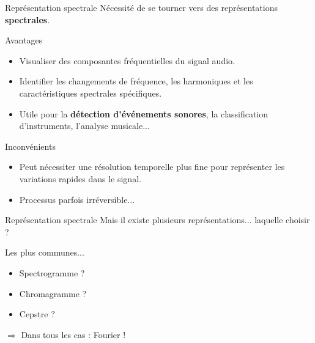 \documentclass[compress,xcolor=table]{beamer}
\begin{document}
\begin{frame}{Représentation spectrale}
    Nécessité de se tourner vers des représentations \textbf{spectrales}.

    \begin{block}{Avantages}
        \begin{itemize}
            \item Visualiser des composantes fréquentielles du signal audio. %
            \item Identifier les changements de fréquence, les harmoniques et les caractéristiques spectrales spécifiques.
            \item Utile pour la \textbf{détection d'événements sonores}, la classification d'instruments, l'analyse musicale...
        \end{itemize}
    \end{block}

    \begin{alertblock}{Inconvénients}
        \begin{itemize}
            \item Peut nécessiter une résolution temporelle plus fine pour représenter les variations rapides dans le signal.
            \item Processus parfois irréversible...
        \end{itemize}
    \end{alertblock}

\end{frame}

\begin{frame}{Représentation spectrale}
    Mais il existe plusieurs représentations... laquelle choisir ?

    \begin{exampleblock}{Les plus communes...}
        \begin{itemize}
            \item Spectrogramme ?
            \item Chromagramme ?
            \item Cepstre ?
        \end{itemize}
    \end{exampleblock}

    $\Rightarrow$ Dans tous les cas : Fourier !
\end{frame}
\end{document}
